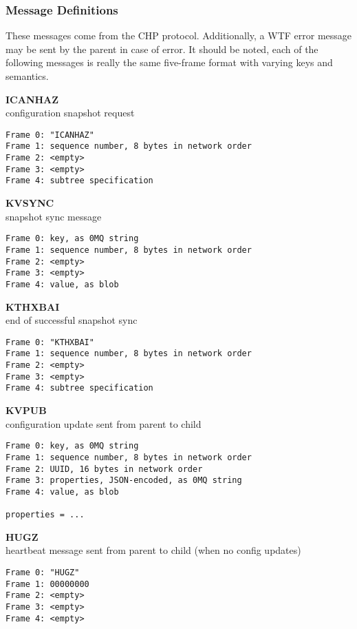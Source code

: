 \subsubsection{Message Definitions}

These messages come from the CHP protocol. Additionally, a WTF error message may be sent by the parent in case of error.
It should be noted, each of the following messages is really the same five-frame format with varying keys and semantics.

\textbf{ICANHAZ} \\
configuration snapshot request

\begin{verbatim}
Frame 0: "ICANHAZ"
Frame 1: sequence number, 8 bytes in network order
Frame 2: <empty>
Frame 3: <empty>
Frame 4: subtree specification
\end{verbatim}

\textbf{KVSYNC} \\
snapshot sync message

\begin{verbatim}
Frame 0: key, as 0MQ string
Frame 1: sequence number, 8 bytes in network order
Frame 2: <empty>
Frame 3: <empty>
Frame 4: value, as blob
\end{verbatim}

\textbf{KTHXBAI} \\
end of successful snapshot sync

\begin{verbatim}
Frame 0: "KTHXBAI"
Frame 1: sequence number, 8 bytes in network order
Frame 2: <empty>
Frame 3: <empty>
Frame 4: subtree specification
\end{verbatim}

\textbf{KVPUB} \\
configuration update sent from parent to child

\begin{verbatim}
Frame 0: key, as 0MQ string
Frame 1: sequence number, 8 bytes in network order
Frame 2: UUID, 16 bytes in network order
Frame 3: properties, JSON-encoded, as 0MQ string
Frame 4: value, as blob

properties = ...
\end{verbatim}

\textbf{HUGZ} \\
heartbeat message sent from parent to child (when no config updates)

\begin{verbatim}
Frame 0: "HUGZ"
Frame 1: 00000000
Frame 2: <empty>
Frame 3: <empty>
Frame 4: <empty>
\end{verbatim}
